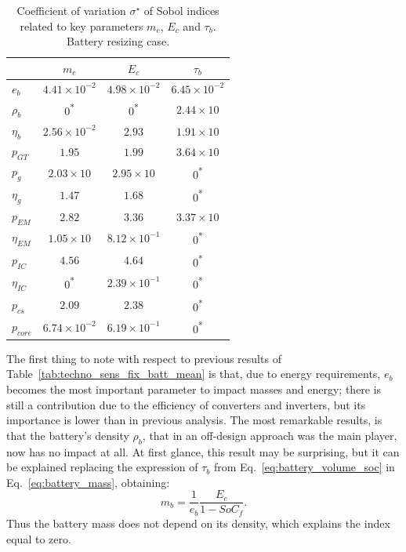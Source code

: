\begin{table}[!h]
	\centering
	\begin{tabular}{l c c c}
		\cline{2-4} 
		&  $m_e$ & $E_c$ & $\tau_{b}$ \\
		\hline
		$e_b$ & $4.41\times10^{-2}$ & $4.98\times10^{-2}$ & $6.45\times10^{-2}$  \\
		$\rho_b$ & 0\textsuperscript{*} & 0\textsuperscript{*} & $2.44\times10$ \\
		$\eta_b$ & $2.56\times10^{-2}$ & $2.93$ & $1.91\times10$ \\
		
		$p_{GT}$ & $1.95$ & $1.99$ & $3.64\times10$ \\
		$p_g$ & $2.03\times10$ & $2.95\times10$ & 0\textsuperscript{*} \\
		$\eta_g$ & $1.47$ & $1.68$ & 0\textsuperscript{*} \\
		
		$p_{EM}$ & $2.82$ & $3.36$ & $3.37\times10$ \\
		$\eta_{EM}$ & $1.05\times10$ & $8.12\times10^{-1}$ & 0\textsuperscript{*}\\
		
		$p_{IC}$ & $4.56$ & $4.64$ & 0\textsuperscript{*} \\
		$\eta_{IC}$ & 0\textsuperscript{*} & $2.39\times10^{-1}$ & 0\textsuperscript{*} \\
		
		$p_{cs}$ & $2.09$ & $2.38$ & 0\textsuperscript{*}\\
		
		$p_{core}$ & $6.74\times10^{-2}$ & $6.19\times10^{-1}$ & 0\textsuperscript{*}\\		
		\hline
	\end{tabular}
	\caption{Coefficient of variation $\sigma^\star$ of Sobol indices related to key parameters $m_e$, $E_c$ and $\tau_{b}$. Battery resizing case.}
	\label{tab:techno_sens_batt_res_coef_var}
\end{table}  

The first thing to note with respect to previous results of Table~\ref{tab:techno_sens_fix_batt_mean} is that, due to energy requirements, $e_{b}$ becomes the most important parameter to impact masses and energy; there is still a contribution due to the efficiency of converters and inverters, but its importance is lower than in previous analysis. 
The most remarkable results, is that the battery's density $\rho_{b}$, that in an off-design approach was the main player, now has no impact at all. 
At first glance, this result may be surprising, but it can be explained replacing the expression of $\tau_{b}$ from Eq.~\eqref{eq:battery_volume_soc} in Eq.~\eqref{eq:battery_mass}, obtaining:
\begin{equation}
\label{eq:battery_mass_rev}
m_b = \frac{1}{e_b}\frac{E_c}{1-SoC_f}.
\end{equation}
Thus the battery mass does not depend on its density, which explains the index equal to zero.

